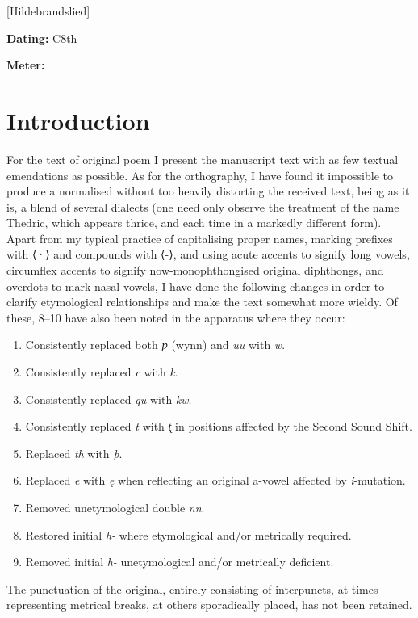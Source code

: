 [Hildebrandslied]

\begin{flushright}%
\textbf{Dating:} C8th

\textbf{Meter:} \Fornyrdislag%
\end{flushright}%

\section{Introduction}

For the text of original poem I present the manuscript text with as few textual emendations as possible. As for the orthography, I have found it impossible to produce a normalised without too heavily distorting the received text, being as it is, a blend of several dialects (one need only observe the treatment of the name Thedric, which appears thrice, and each time in a markedly different form). Apart from my typical practice of capitalising proper names, marking prefixes with ⟨·⟩ and compounds with ⟨-⟩, and using acute accents to signify long vowels, circumflex accents to signify now-monophthongised original diphthongs, and overdots to mark nasal vowels, I have done the following changes in order to clarify etymological relationships and make the text somewhat more wieldy. Of these, 8–10 have also been noted in the apparatus where they occur:
\begin{enumerate}
  \item Consistently replaced both \emph{ƿ} (wynn) and \emph{uu} with \emph{w}.
  \item Consistently replaced \emph{c} with \emph{k}.
  \item Consistently replaced \emph{qu} with \emph{kw}.
  \item Consistently replaced \emph{t} with \emph{t̨} in positions affected by the Second Sound Shift.
  \item Replaced \emph{th} with \emph{þ}.
  \item Replaced \emph{e} with \emph{ę} when reflecting an original a-vowel affected by \emph{i}-mutation.
  \item Removed unetymological double \emph{nn}.
  \item Restored initial \emph{h-} where etymological and/or metrically required.
  \item Removed initial \emph{h-} unetymological and/or metrically deficient.
\end{enumerate}

The punctuation of the original, entirely consisting of interpuncts, at times representing metrical breaks, at others sporadically placed, has not been retained.

